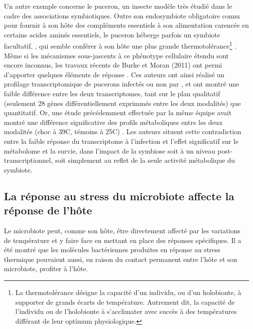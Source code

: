 Un autre exemple concerne le puceron, un insecte modèle très étudié dans le cadre des associations symbiotiques.
Outre son endosymbiote obligatoire  connu pour fournir à son hôte des compléments essentiels à son alimentation carencée en certains acides aminés essentiels, le puceron  héberge parfois un symbiote facultatif, , qui semble conférer à son hôte une plus grande thermotolérance\footnote{La thermotolérance désigne la capacité d'un individu, ou d'un holobionte, à supporter de grands écarts de température. Autrement dit, la capacité de l'individu ou de l'holobionte à s'acclimater avec succès à des températures différant de leur optimum physiologique.} \cite{montllor2002}.
Même si les mécanismes sous-jascents à ce phénotype cellulaire étendu sont encore inconnus, les travaux récents de Burke et Moran (2011) ont permi d'apporter quelques éléments de réponse \cite{burke2011}.
Ces auteurs ont ainsi réalisé un profilage transcriptomique de pucerons infectés ou non par , et ont montré une faible différence entre les deux transcriptomes, tant sur le plan qualitatif (seulement 28 gènes différentiellement exprimmés entre les deux modalités) que quantitatif.
Or, une étude précédemment effectuée par la même équipe avait montré une différence significative des profils métaboliques entre les deux modalités (choc à 39\textdegree{}C, témoins à 25\textdegree{}C) \cite{burke2009}.
Les auteurs situent cette contradiction entre la faible réponse du transcriptome à l'infection et l'effet significatif sur le métabolome et la survie, dans l'impact de la symbiose soit à un niveau post-transcriptionnel, soit simplement au reflet de la seule activité métabolique du symbiote.


\subsection{La réponse au stress du microbiote affecte la réponse de l'hôte}

Le microbiote peut, comme son hôte, être directement affecté par les variations de température et y faire face en mettant en place des réponses spécifiques.
Il a été montré que les molécules bactériennes produites en réponse au stress thermique pouvaient aussi, en raison du contact permanent entre l'hôte et son microbiote, profiter à l'hôte.

